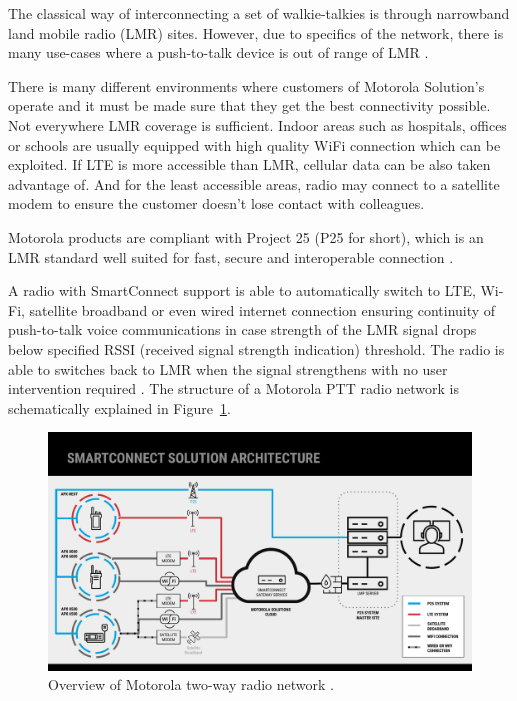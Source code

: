 The classical way of interconnecting a set of walkie-talkies is through narrowband land mobile radio (LMR) sites.
However, due to specifics of the network, there is many use-cases where a push-to-talk device is out of range of LMR \cite{apxnextslides}. 

There is many different environments where customers of Motorola Solution's operate and it must be made sure that they get the best connectivity possible. Not everywhere LMR coverage is sufficient.  Indoor areas such as hospitals, offices or schools are usually equipped with high quality WiFi connection which can be exploited. If LTE is more accessible than LMR, cellular data can be also taken advantage of. And for the least accessible areas, radio may connect to a satellite modem to ensure the customer doesn't lose contact with colleagues. 

Motorola products are compliant with Project 25 (P25 for short), which is an LMR standard well suited for fast, secure and interoperable connection \cite{project25}.

A radio with SmartConnect support is able to automatically switch to LTE, Wi-Fi, satellite broadband or even wired internet connection ensuring continuity of push-to-talk voice communications in case strength of the LMR signal drops below specified RSSI (received signal strength indication) threshold. 
The radio is able to switches back to LMR when the signal strengthens with no user intervention required \cite{apxnextfactsheet} \cite{businesswireapxnext}.
The structure of a Motorola PTT radio network is schematically explained in Figure~\ref{smart-connect:smart-connect-architecture}.

\begin{figure}[h]
    \centering
    \includegraphics[width=\textwidth]{img/motorola-smart-connect-architecture.pdf}
    \caption{Overview of Motorola two-way radio network \cite{apxnextslides}.}
    \label{smart-connect:smart-connect-architecture}
\end{figure}

